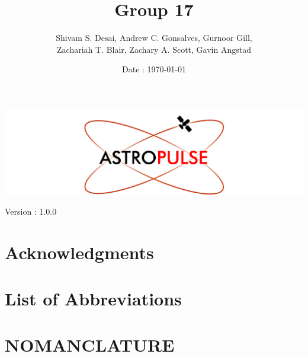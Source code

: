 \documentclass[en, screen, 12pt]{report}
\title{Group 17 \\ \doctitle}
\author{
Shivam S. Desai, 
Andrew C. Gonsalves, 
Gurnoor Gill, \\
Zachariah T. Blair,
Zachary A. Scott,
Gavin Angstad
}
\date{Date : \mydate\today}
\makeatletter
\newcommand{\VersionNumber}{Version : 1.0.0} %
\renewcommand{\maketitle}{
  \begin{titlepage}
    \null\vfill
    \centering
    \includegraphics[width=1.0\textwidth]{images/ASTROPULSE LOGO.png}
    \par\vspace{2em}
    {\Huge\bfseries\@title\par}
    \vspace{1.5em}
    {\Large\@author}
    \par\vspace{2em}
    {\Large\@date}
    \par\vspace{2em}
    {\Large\VersionNumber}
    \vfill





    
    \null
  \end{titlepage}
}
\makeatother
\begin{document}
\maketitle

% 

\newpage
\tableofcontents
\newpage

\chapter*{Acknowledgments}


\newpage
\chapter*{List of Abbreviations}


\newpage
\chapter*{NOMANCLATURE}

















\end{document}
